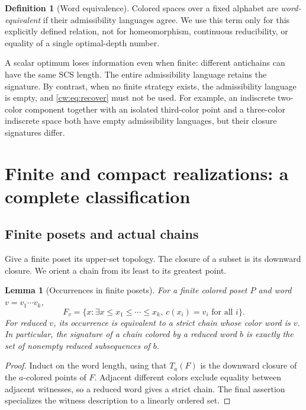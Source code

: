 \documentclass[11pt,letterpaper]{article}
\numberwithin{equation}{section}
\newtheorem{lemma}[lemma]{Lemma}
\theoremstyle{definition}
\newtheorem{definition}[definition]{Definition}
\theoremstyle{remark}
\theoremstyle{definition}
\begin{document}
\begin{definition}[Word equivalence]
Colored spaces over a fixed alphabet are \emph{word-equivalent} if their
admissibility languages agree. We use this term only for this explicitly
defined relation, not for homeomorphism, continuous reducibility, or equality
of a single optimal-depth number.
\end{definition}

A scalar optimum loses information even when finite: different antichains
can have the same SCS length. The entire admissibility language retains the
signature. By contrast, when no finite strategy exists, the admissibility
language is empty, and \eqref{cw:eq:recover} must not be used. For example,
an indiscrete two-color component together with an isolated third-color point
and a three-color indiscrete space both have empty admissibility languages,
but their closure signatures differ.

\section{Finite and compact realizations: a complete classification}
\label{cw:sec:realization}

\subsection{Finite posets and actual chains}

Give a finite poset its upper-set topology. The closure of a subset is its
downward closure. We orient a chain from its least to its greatest point.

\begin{lemma}[Occurrences in finite posets]\label{cw:lem:poset}
For a finite colored poset $P$ and word $v=v_1\cdots v_k$,
\[
 F_v=\{x:\exists x\le x_1\le\cdots\le x_k,
                     \ c(x_i)=v_i\text{ for all }i\}.
\]
For reduced $v$, its occurrence is equivalent to a strict chain whose color
word is $v$. In particular, the signature of a chain colored by a reduced
word $b$ is exactly the set of nonempty reduced subsequences of $b$.
\end{lemma}
\begin{proof}
Induct on the word length, using that $T_a(F)$ is the downward closure of
the $a$-colored points of $F$. Adjacent different colors exclude equality
between adjacent witnesses, so a reduced word gives a strict chain.
The final assertion specializes the witness description to a linearly
ordered set.
\end{proof}
\end{document}
